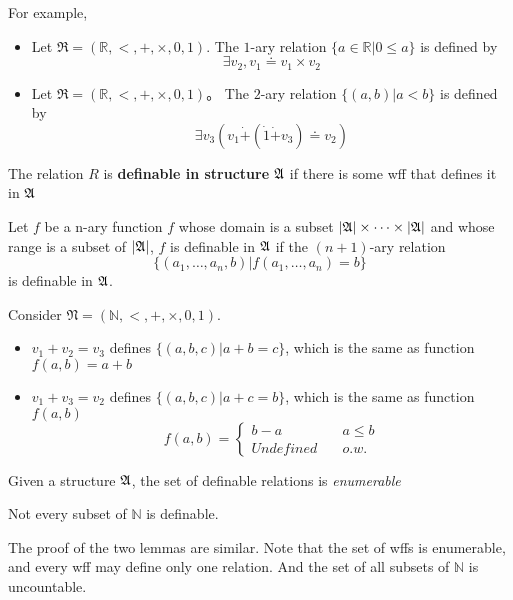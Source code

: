 For example,

\begin{itemize}
    \item Let $\mathfrak{R} = (\mathbb{R},<,+,\times,0,1)$. The $1$-ary relation $\{ a \in \mathbb{R} | 0 \le a \}$ is defined by
    \[ \exists v_2, v_1 \doteq v_1 \times v_2 \]
    \item Let $\mathfrak{R} = (\mathbb{R},<,+,\times,0,1)$。 The $2$-ary relation $\{ (a,b) | a < b \}$ is defined by
    \[ \exists v_3 (v_1\dot{+}(\dot{1}\dot{+}v_3)\doteq v_2) \]
\end{itemize}

\begin{definition}
    The relation $R$ is \textbf{definable in structure} $\mathfrak{A}$ if there is some wff that defines it in $\mathfrak{A}$

    Let $f$ be a n-ary function $f$ whose domain is a subset $|\mathfrak{A}| \times \dots \times |\mathfrak{A}|$ and whose range is a subset of $|\mathfrak{A}|$, $f$ is definable in $\mathfrak{A}$ if the $(n+1)$-ary relation
    \[ \{ (a_1,\dots,a_n, b) | f(a_1,\dots,a_n) = b \} \]
    is definable in $\mathfrak{A}$.
\end{definition}

Consider $\mathfrak{N} = (\mathbb{N},<,+,\times,0,1)$.
\begin{itemize}
    \item $v_1 + v_2 = v_3$ defines $\{ (a,b,c) | a + b = c \}$, which is the same as function $f(a,b) = a + b$
    \item $v_1 + v_3 = v_2$ defines $\{ (a,b,c) | a+c = b \}$, which is the same as function $f(a,b)$
    \[ f(a,b) = \begin{cases}
        b - a &\quad a \le b\\
        Undefined &\quad o.w.
    \end{cases} \]
\end{itemize}

\begin{lemma}
    Given a structure $\mathfrak{A}$, the set of definable relations is \emph{enumerable}
\end{lemma}
\begin{lemma}
    Not every subset of $\mathbb{N}$ is definable.
\end{lemma}

The proof of the two lemmas are similar. Note that the set of wffs is enumerable, and every wff may define only one relation. And the set of all subsets of $\mathbb{N}$ is uncountable.

